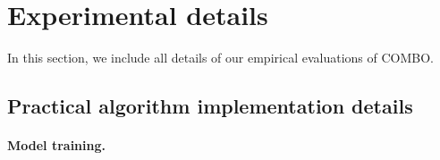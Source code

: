 
\section{Experimental details}
\label{app:details}

In this section, we include all details of our empirical evaluations of COMBO.

\subsection{Practical algorithm implementation details}
\label{app:combo_details}

\paragraph{Model training.}

